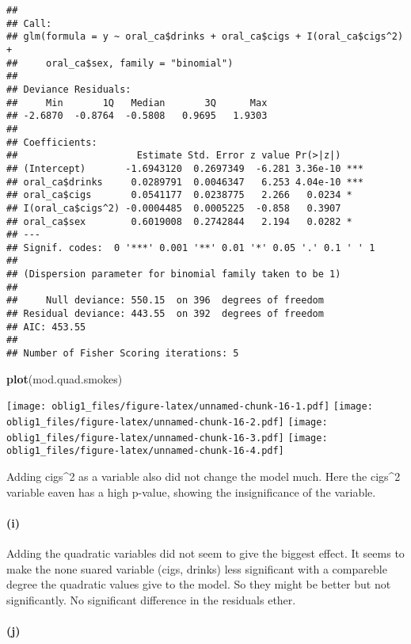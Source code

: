 \documentclass[
]{article}
\newenvironment{Shaded}{\begin{snugshade}}{\end{snugshade}}
\newcommand{\KeywordTok}[1]{\textcolor[rgb]{0.13,0.29,0.53}{\textbf{#1}}}
\newcommand{\NormalTok}[1]{#1}
\begin{document}
\begin{verbatim}
## 
## Call:
## glm(formula = y ~ oral_ca$drinks + oral_ca$cigs + I(oral_ca$cigs^2) + 
##     oral_ca$sex, family = "binomial")
## 
## Deviance Residuals: 
##     Min       1Q   Median       3Q      Max  
## -2.6870  -0.8764  -0.5808   0.9695   1.9303  
## 
## Coefficients:
##                     Estimate Std. Error z value Pr(>|z|)    
## (Intercept)       -1.6943120  0.2697349  -6.281 3.36e-10 ***
## oral_ca$drinks     0.0289791  0.0046347   6.253 4.04e-10 ***
## oral_ca$cigs       0.0541177  0.0238775   2.266   0.0234 *  
## I(oral_ca$cigs^2) -0.0004485  0.0005225  -0.858   0.3907    
## oral_ca$sex        0.6019008  0.2742844   2.194   0.0282 *  
## ---
## Signif. codes:  0 '***' 0.001 '**' 0.01 '*' 0.05 '.' 0.1 ' ' 1
## 
## (Dispersion parameter for binomial family taken to be 1)
## 
##     Null deviance: 550.15  on 396  degrees of freedom
## Residual deviance: 443.55  on 392  degrees of freedom
## AIC: 453.55
## 
## Number of Fisher Scoring iterations: 5
\end{verbatim}

\begin{Shaded}
\begin{Highlighting}[]
\KeywordTok{plot}\NormalTok{(mod.quad.smokes)}
\end{Highlighting}
\end{Shaded}

\texttt{[image: oblig1\_files/figure-latex/unnamed-chunk-16-1.pdf]}
\texttt{[image: oblig1\_files/figure-latex/unnamed-chunk-16-2.pdf]}
\texttt{[image: oblig1\_files/figure-latex/unnamed-chunk-16-3.pdf]}
\texttt{[image: oblig1\_files/figure-latex/unnamed-chunk-16-4.pdf]}

Adding cigs\^{}2 as a variable also did not change the model much. Here
the cigs\^{}2 variable eaven has a high p-value, showing the
insignificance of the variable.

\hypertarget{i}{%
\paragraph{(i)}\label{i}}

Adding the quadratic variables did not seem to give the biggest effect.
It seems to make the none suared variable (cigs, drinks) less
significant with a compareble degree the quadratic values give to the
model. So they might be better but not significantly. No significant
difference in the residuals ether.

\hypertarget{j}{%
\paragraph{(j)}\label{j}}
\end{document}
